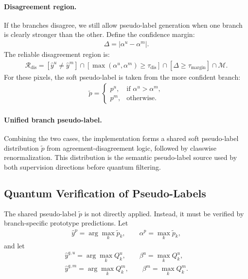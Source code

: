 \paragraph{Disagreement region.}
If the branches disagree, we still allow pseudo-label generation when one branch is clearly stronger than the other. Define the confidence margin:
\begin{align}
    \Delta = |\alpha^u - \alpha^m|.
\end{align}
The reliable disagreement region is:
\begin{align}
    \mathcal{R}_{\mathrm{dis}}
    =
    \left[
    \hat{y}^u \neq \hat{y}^m
    \right]
    \cap
    \left[
    \max(\alpha^u,\alpha^m) \ge \tau_{\mathrm{dis}}
    \right]
    \cap
    \left[
    \Delta \ge \tau_{\mathrm{margin}}
    \right]
    \cap
    \mathcal{M}.
\end{align}
For these pixels, the soft pseudo-label is taken from the more confident branch:
\begin{align}
    \tilde{p} =
    \begin{cases}
    p^u, & \text{if } \alpha^u > \alpha^m, \\
    p^m, & \text{otherwise}.
    \end{cases}
\end{align}

\paragraph{Unified branch pseudo-label.}
Combining the two cases, the implementation forms a shared soft pseudo-label distribution $\tilde{p}$ from agreement-disagreement logic, followed by classwise renormalization. This distribution is the semantic pseudo-label source used by both supervision directions before quantum filtering.

\subsection{Quantum Verification of Pseudo-Labels}
\label{subsec:quantum_verification}
The shared pseudo-label $\tilde{p}$ is not directly applied. Instead, it must be verified by branch-specific prototype predictions. Let
\begin{align}
    \hat{y}^{p} = \arg\max_k \tilde{p}_k, \qquad
    \alpha^{p} = \max_k \tilde{p}_k,
\end{align}
and let
\begin{align}
    \hat{y}^{q,u} = \arg\max_k Q_k^u, \qquad
    \beta^u = \max_k Q_k^u, \\
    \hat{y}^{q,m} = \arg\max_k Q_k^m, \qquad
    \beta^m = \max_k Q_k^m.
\end{align}

